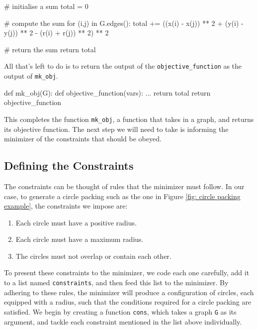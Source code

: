 \begin{code}
    # initialise a sum
    total = 0
    
    # compute the sum 
    for (i,j) in G.edges():
        total += ((x(i) - x(j)) ** 2 + (y(i) - y(j)) ** 2 - (r(i) + r(j)) ** 2) ** 2
    
    # return the sum
    return total
\end{code}

\begin{flushleft}
All that's left to do is to return the output of the \texttt{objective\_function} as the output of \texttt{mk\_obj}.
\end{flushleft}

\begin{code}
    def mk_obj(G):
        def objective_function(vars):
            ...
            return total
        return objective_function
\end{code}

\begin{flushleft}
This completes the function \texttt{mk\_obj}, a function that takes in a graph, and returns its objective function. The next step we will need to take is informing the minimizer of the constraints that should be obeyed.
\end{flushleft}

\subsection{Defining the Constraints}

\begin{flushleft}
The constraints can be thought of rules that the minimizer must follow. In our case, to generate a circle packing such as the one in Figure \ref{fig: circle packing example}, the constraints we impose are:

\begin{enumerate}
    \item Each circle must have a positive radius.
    \vspace{-3mm}
    \item Each circle must have a maximum radius.
    \vspace{-3mm}
    \item The circles must not overlap or contain each other.
\end{enumerate}

To present these constraints to the minimizer, we code each one carefully, add it to a list named \texttt{constraints}, and then feed this list to the minimizer. By adhering to these rules, the minimizer will produce a configuration of circles, each equipped with a radius, such that the conditions required for a circle packing are satisfied. We begin by creating a function \texttt{cons}, which takes a graph \texttt{G} as its argument, and tackle each constraint mentioned in the list above individually.
\end{flushleft}

